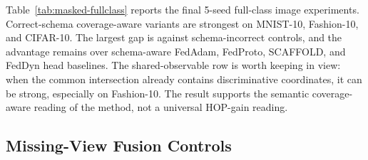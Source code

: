 \documentclass[preprint]{elsarticle}
\begin{document}

Table~\ref{tab:masked-fullclass} reports the final 5-seed full-class image experiments. Correct-schema coverage-aware variants are strongest on MNIST-10, Fashion-10, and CIFAR-10. The largest gap is against schema-incorrect controls, and the advantage remains over schema-aware FedAdam, FedProto, SCAFFOLD, and FedDyn head baselines. The shared-observable row is worth keeping in view: when the common intersection already contains discriminative coordinates, it can be strong, especially on Fashion-10. The result supports the semantic coverage-aware reading of the method, not a universal HOP-gain reading.

\subsection{Missing-View Fusion Controls}
\end{document}
